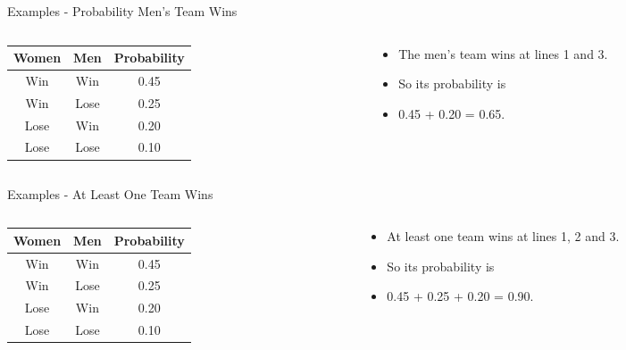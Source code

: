 \documentclass[
  ignorenonframetext,
]{beamer}
\providecommand{\tightlist}{%
  \setlength{\itemsep}{0pt}\setlength{\parskip}{0pt}}
\renewcommand{\,}{\text{, }}
\begin{document}
\begin{frame}{Examples - Probability Men's Team Wins}
\protect\hypertarget{examples---probability-mens-team-wins}{}
\begin{columns}[T]
\begin{column}{0.48\textwidth}
\begin{longtable}[]{@{}ccc@{}}
\toprule
Women & Men & Probability \\
\midrule
\endhead
Win & Win & 0.45 \\
Win & Lose & 0.25 \\
Lose & Win & 0.20 \\
Lose & Lose & 0.10 \\
\bottomrule
\end{longtable}
\end{column}

\begin{column}{0.48\textwidth}
\bigskip

\begin{itemize}
\tightlist
\item
  The men's team wins at lines 1 and 3.
\item
  So its probability is
\item
  0.45 + 0.20 = 0.65.
\end{itemize}
\end{column}
\end{columns}
\end{frame}

\begin{frame}{Examples - At Least One Team Wins}
\protect\hypertarget{examples---at-least-one-team-wins}{}
\begin{columns}[T]
\begin{column}{0.48\textwidth}
\begin{longtable}[]{@{}ccc@{}}
\toprule
Women & Men & Probability \\
\midrule
\endhead
Win & Win & 0.45 \\
Win & Lose & 0.25 \\
Lose & Win & 0.20 \\
Lose & Lose & 0.10 \\
\bottomrule
\end{longtable}
\end{column}

\begin{column}{0.48\textwidth}
\bigskip

\begin{itemize}
\tightlist
\item
  At least one team wins at lines 1, 2 and 3.
\item
  So its probability is
\item
  0.45 + 0.25 + 0.20 = 0.90.
\end{itemize}
\end{column}
\end{columns}
\end{frame}
\end{document}
